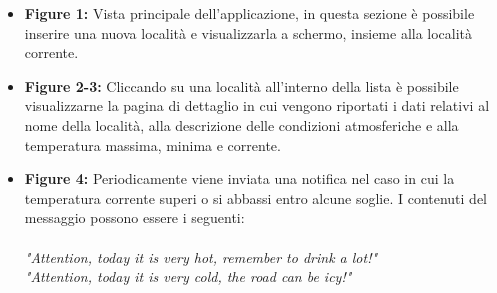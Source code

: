 \documentclass{article}
\begin{document}
\begin{itemize}
    \item \textbf{Figure 1:} Vista principale dell'applicazione, in questa sezione è possibile inserire una nuova località e visualizzarla a schermo, insieme alla località corrente.
    \item \textbf{Figure 2-3:} Cliccando su una località all'interno della lista è possibile visualizzarne la pagina di dettaglio in cui vengono riportati i dati relativi al nome della località, alla descrizione delle condizioni atmosferiche e alla temperatura massima, minima e corrente.
    \item \textbf{Figure 4:} Periodicamente viene inviata una notifica nel caso in cui la temperatura corrente superi o si abbassi entro alcune soglie. I contenuti del messaggio possono essere i seguenti: \\\\ \textit{"Attention, today it is very hot, remember to drink a lot!"} \\ \textit{"Attention, today it is very cold, the road can be icy!"}
\end{itemize}
\end{document}
